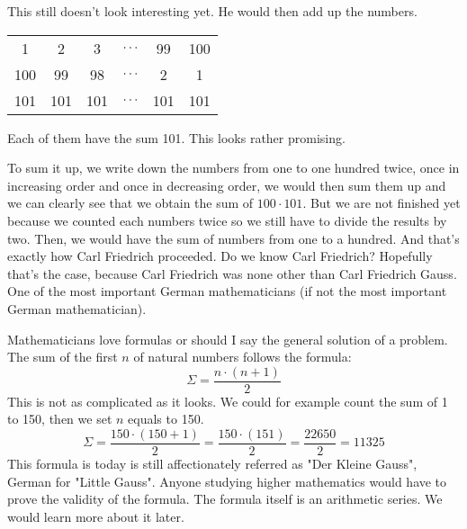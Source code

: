 \noindent This still doesn't look interesting yet. He would then add up the numbers.

\begin{center}
	\begin{tabular}{cccccc}
		1   & 2  & 3  & $\mathellipsis$ & 99 & 100 \\
		100 & 99 & 98 & $\mathellipsis$ & 2  & 1  \\
		101 & 101 & 101 & $\mathellipsis$ & 101 & 101
	\end{tabular}
\end{center}

\noindent Each of them have the sum 101. This looks rather promising. 

\vspace{5mm} %

\noindent To sum it up, we write down the numbers from one to one hundred twice, once in increasing order and once in decreasing order, we would then sum them up and we can clearly see that we obtain the sum of $100 \cdot 101$. But we are not finished yet because we counted each numbers twice so we still have to divide the results by two. Then, we would have the sum of numbers from one to a hundred. And that's exactly how Carl Friedrich proceeded. Do we know Carl Friedrich? Hopefully that's the case, because Carl Friedrich was none other than Carl Friedrich Gauss. One of the most important German mathematicians (if not the most important German mathematician).

\vspace{5mm} %


\vspace{5mm} %

\noindent Mathematicians love formulas or should I say the general solution of a problem. The sum of the first $n$ of natural numbers follows the formula:
\begin{equation}
	\Sigma = \frac{n\cdot(n+1)}{2}
\end{equation}
\noindent This is not as complicated as it looks. We could for example count the sum of 1 to 150, then we set $n$ equals to 150.
\begin{equation}
	\Sigma = \frac{150\cdot(150+1)}{2}= \frac{150\cdot(151)}{2}= \frac{22650}{2}=11325
\end{equation}
\noindent This formula is today is still affectionately referred as "Der Kleine Gauss", German for "Little Gauss". Anyone studying higher mathematics would have to prove the validity of the formula. The formula itself is an arithmetic series. We would learn more about it later.

